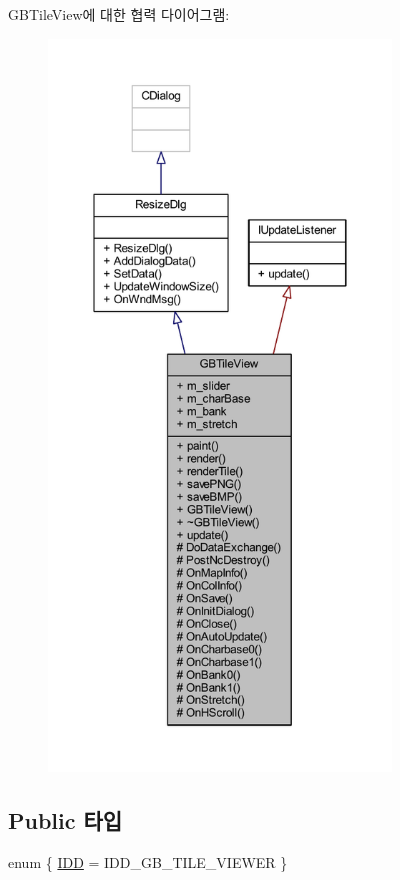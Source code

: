 G\+B\+Tile\+View에 대한 협력 다이어그램\+:\nopagebreak
\begin{figure}[H]
\begin{center}
\leavevmode
\includegraphics[height=550pt]{class_g_b_tile_view__coll__graph}
\end{center}
\end{figure}
\subsection*{Public 타입}
\begin{DoxyCompactItemize}
\item 
enum \{ \mbox{\hyperlink{class_g_b_tile_view_a827f593cb0979d00c2e51aab7eecc619abaee2c28dc1c6835365ec6a66fccc5da}{I\+DD}} = I\+D\+D\+\_\+\+G\+B\+\_\+\+T\+I\+L\+E\+\_\+\+V\+I\+E\+W\+ER
 \}
\end{DoxyCompactItemize}
